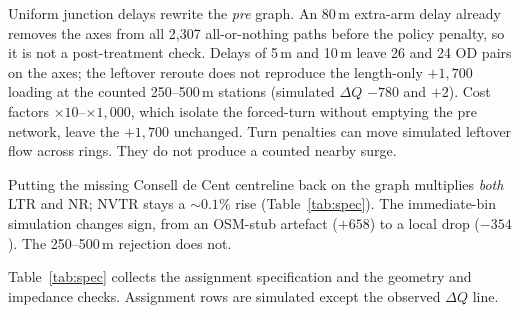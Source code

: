 \documentclass[a4paper,fleqn]{cas-dc}
\newcommand{\DQ}{\Delta Q}
\begin{document}
Uniform junction delays rewrite the \emph{pre} graph. An 80\,m extra-arm
delay already removes the axes from all 2{,}307 all-or-nothing paths before
the policy penalty, so it is not a post-treatment check. Delays of 5\,m and
10\,m leave 26 and 24 OD pairs on the axes; the leftover reroute does not
reproduce the length-only $+1{,}700$ loading at the counted 250--500\,m
stations (simulated $\DQ$ $-780$ and $+2$). Cost factors
$\times 10$--$\times 1{,}000$, which isolate the forced-turn without
emptying the pre network, leave the $+1{,}700$ unchanged. Turn penalties
can move simulated leftover flow across rings. They do not produce a
counted nearby surge.

Putting the missing Consell de Cent centreline back on the graph multiplies
\emph{both} LTR and NR; NVTR stays a $\sim 0.1\%$ rise
(Table~\ref{tab:spec}). The immediate-bin simulation changes sign, from an
OSM-stub artefact ($+658$) to a local drop ($-354$). The 250--500\,m rejection
does not.

Table~\ref{tab:spec} collects the assignment specification and the geometry
and impedance checks. Assignment rows are simulated except the observed
$\DQ$ line.
\end{document}
